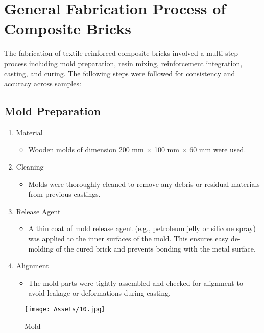 \section{General Fabrication Process of Composite Bricks}
The fabrication of textile-reinforced composite bricks involved a multi-step process including mold preparation, resin mixing, reinforcement integration, casting, and curing. The following steps were followed for consistency and accuracy across samples:

\subsection{Mold Preparation}
\begin{enumerate}
	\item  Material
	      \begin{itemize}
		      \item Wooden molds of dimension 200 mm $\times$ 100 mm $\times$ 60 mm were used.
	      \end{itemize}
	\item Cleaning
	      \begin{itemize}
		      \item Molds were thoroughly cleaned to remove any debris or residual materials from previous castings.
	      \end{itemize}
	\item  Release Agent
	      \begin{itemize}
		      \item A thin coat of mold release agent (e.g., petroleum jelly or silicone spray) was applied to the inner surfaces of the mold. This ensures easy de-molding of the cured brick and prevents bonding with the metal surface.
	      \end{itemize}
	\item  Alignment
	      \begin{itemize}
		      \item The mold parts were tightly assembled and checked for alignment to avoid leakage or deformations during casting.
	      \end{itemize}
\end{enumerate}

\begin{figure}[H]
	\centering
	\texttt{[image: Assets/10.jpg]}
	\caption{Mold}
	\label{fig:placeholder}
\end{figure}

